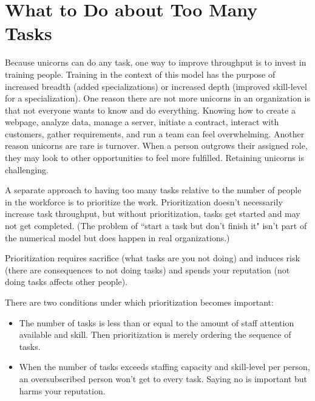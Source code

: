 \section*{What to Do about Too Many Tasks}


Because unicorns can do any task, one way to improve throughput is to invest in training people. Training in the context of this model has the purpose of  increased breadth (added specializations) or increased depth (improved skill-level for a specialization). One reason there are not more unicorns in an organization is that not everyone wants to know and do everything. Knowing how to create a webpage, analyze data, manage a server, initiate a contract, interact with customers, gather requirements, and run a team can feel overwhelming. Another reason unicorns are rare is turnover. When a person outgrows their assigned role,  they may look to other opportunities to feel more fulfilled. Retaining unicorns is challenging.

A separate approach to having too many tasks relative to the number of people in the workforce is to prioritize the work. Prioritization doesn't necessarily increase task throughput, but without prioritization, tasks get started and may not get completed. (The problem of ``start a task but don't finish it" isn't part of the numerical model but does happen in real organizations.)

Prioritization requires sacrifice (what tasks are you not doing) and induces risk (there are consequences to not doing tasks) and spends your reputation (not doing tasks affects other people).

There are two conditions under which prioritization becomes important:
\begin{itemize}
    \item The number of tasks is less than or equal to the amount of staff attention available and skill. Then prioritization is merely ordering the sequence of tasks.
    \item When the number of tasks exceeds staffing capacity and skill-level per person, an oversubscribed person won't get to every task. Saying no is important but harms your reputation.
\end{itemize}



